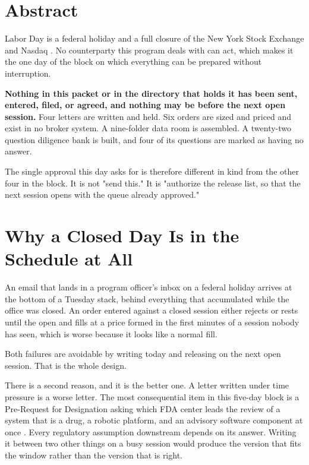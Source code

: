 \section*{Abstract}

Labor Day is a federal holiday and a full closure of the New York Stock Exchange
and Nasdaq \cite{opmholidays2026,nyseholidays2026}. No counterparty this program
deals with can act, which makes it the one day of the block on which everything
can be prepared without interruption.

\textbf{Nothing in this packet or in the directory that holds it has been sent,
entered, filed, or agreed, and nothing may be before the next open session.} Four
letters are written and held. Six orders are sized and priced and exist in no
broker system. A nine-folder data room is assembled. A twenty-two question
diligence bank is built, and four of its questions are marked as having no
answer.

The single approval this day asks for is therefore different in kind from the
other four in the block. It is not "send this." It is "authorize the release
list, so that the next session opens with the queue already approved."

\section{Why a Closed Day Is in the Schedule at All}

An email that lands in a program officer's inbox on a federal holiday arrives at
the bottom of a Tuesday stack, behind everything that accumulated while the
office was closed. An order entered against a closed session either rejects or
rests until the open and fills at a price formed in the first minutes of a
session nobody has seen, which is worse because it looks like a normal fill.

Both failures are avoidable by writing today and releasing on the next open
session. That is the whole design.

There is a second reason, and it is the better one. A letter written under time
pressure is a worse letter. The most consequential item in this five-day block is
a Pre-Request for Designation asking which FDA center leads the review of a
system that is a drug, a robotic platform, and an advisory software component at
once \cite{fdacombination2026}. Every regulatory assumption downstream depends on
its answer. Writing it between two other things on a busy session would produce
the version that fits the window rather than the version that is right.

